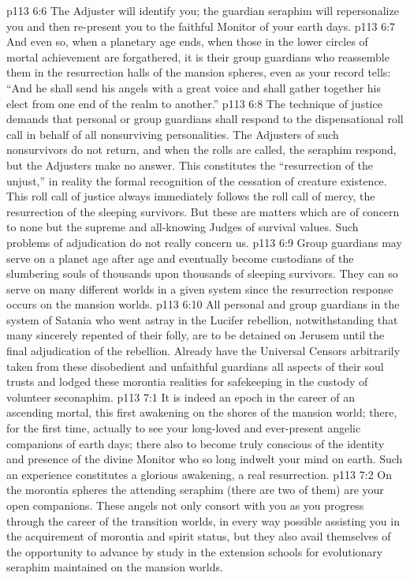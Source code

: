 \vs p113 6:6 The Adjuster will identify you; the guardian seraphim will repersonalize you and then re\hyp{}present you to the faithful Monitor of your earth days.
\vs p113 6:7 And even so, when a planetary age ends, when those in the lower circles of mortal achievement are forgathered, it is their group guardians who reassemble them in the resurrection halls of the mansion spheres, even as your record tells: “And he shall send his angels with a great voice and shall gather together his elect from one end of the realm to another.”
\vs p113 6:8 \pc The technique of justice demands that personal or group guardians shall respond to the dispensational roll call in behalf of all nonsurviving personalities. The Adjusters of such nonsurvivors do not return, and when the rolls are called, the seraphim respond, but the Adjusters make no answer. This constitutes the “resurrection of the unjust,” in reality the formal recognition of the cessation of creature existence. This roll call of justice always immediately follows the roll call of mercy, the resurrection of the sleeping survivors. But these are matters which are of concern to none but the supreme and all\hyp{}knowing Judges of survival values. Such problems of adjudication do not really concern us.
\vs p113 6:9 \pc Group guardians may serve on a planet age after age and eventually become custodians of the slumbering souls of thousands upon thousands of sleeping survivors. They can so serve on many different worlds in a given system since the resurrection response occurs on the mansion worlds.
\vs p113 6:10 All personal and group guardians in the system of Satania who went astray in the Lucifer rebellion, notwithstanding that many sincerely repented of their folly, are to be detained on Jerusem until the final adjudication of the rebellion. Already have the Universal Censors arbitrarily taken from these disobedient and unfaithful guardians all aspects of their soul trusts and lodged these morontia realities for safekeeping in the custody of volunteer seconaphim.
\vs p113 7:1 It is indeed an epoch in the career of an ascending mortal, this first awakening on the shores of the mansion world; there, for the first time, actually to see your long\hyp{}loved and ever\hyp{}present angelic companions of earth days; there also to become truly conscious of the identity and presence of the divine Monitor who so long indwelt your mind on earth. Such an experience constitutes a glorious awakening, a real resurrection.
\vs p113 7:2 On the morontia spheres the attending seraphim (there are two of them) are your open companions. These angels not only consort with you as you progress through the career of the transition worlds, in every way possible assisting you in the acquirement of morontia and spirit status, but they also avail themselves of the opportunity to advance by study in the extension schools for evolutionary seraphim maintained on the mansion worlds.
